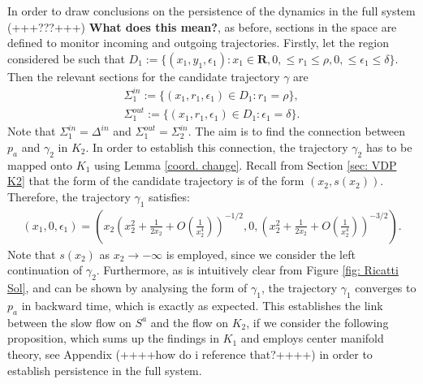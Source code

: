 In order to draw conclusions on the persistence of the dynamics in the full system (+++???+++) \textbf{What does this mean?}, as before, sections in the space are defined to monitor incoming and outgoing trajectories.
Firstly, let the region considered be such that
$D_1:= \{ (x_1,y_1,\epsilon_1): x_1 \in \mathbf{R}, 0, \leq r_1 \leq \rho, 0, \leq\epsilon_1 \leq \delta\}$.
Then the relevant sections for the candidate trajectory $\gamma$ are
\begin{align*}
\Sigma^{in}_1 := \{ (x_1,r_1, \epsilon_1) \in D_1 : r_1 = \rho \}, \\
\Sigma^{out}_1 := \{ (x_1,r_1, \epsilon_1) \in D_1 : \epsilon_1=\delta \}.
\end{align*}
Note that $\Sigma^{in}_1 = \Delta^{in}$ and $\Sigma^{out}_1=\Sigma^{in}_2$.
The aim is to find the connection between $p_a$ and $\gamma_2$ in $K_2$. In order to establish this connection, the trajectory $\gamma_2$ has to be mapped onto $K_1$ using Lemma \ref{coord. change}. Recall from Section \ref{sec: VDP K2} that the form of the candidate trajectory is of the form $(x_2, s(x_2))$.
Therefore, the trajectory $\gamma_1$ satisfies:
\begin{align*}
(x_1, 0, \epsilon_1) = \left(x_2 \left(x_2^2 + \frac{1}{2x_2} + O\left(\frac{1}{x_2^4} \right) \right)^{-1/2}, 0, \left(x_2^2 + \frac{1}{2x_2} + O\left(\frac{1}{x_2^4} \right)\right)^{-3/2} \right).
\end{align*}
Note that $s(x_2)$ as $x_2 \to - \infty$ is employed, since we consider the left continuation of $\gamma_2$.
Furthermore, as is intuitively clear from Figure \ref{fig: Ricatti Sol}, and can be shown by analysing the form of $\gamma_1$, the trajectory $\gamma_1$ converges to $p_a$ in backward time, which is exactly as expected.
This establishes the link between the slow flow on $S^a$ and the flow on $K_2$, if we consider the following proposition, which sums up the findings in $K_1$ and employs center manifold theory, see Appendix (++++how do i reference that?++++) in order to establish persistence in the full system.
